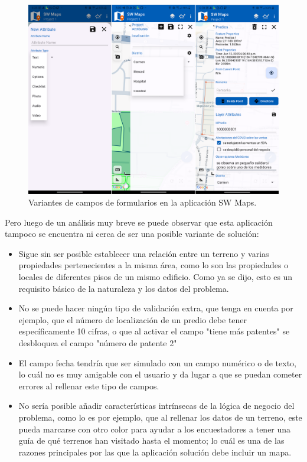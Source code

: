 \begin{figure}[h]
    \centering
    \includegraphics[scale=0.15]{Graphics/sw_maps_campos.png}
    \caption{Variantes de campos de formularios en la aplicación SW Maps.}
    \label{fig:figura9}
\end{figure}

Pero luego de un análisis muy breve se puede observar que esta aplicación tampoco se encuentra ni cerca de ser una posible variante de solución:
\begin{itemize}
    \item Sigue sin ser posible establecer una relación entre un terreno y varias propiedades pertenecientes a la misma área, como lo son las propiedades o locales de diferentes pisos de un mismo edificio. Como ya se dijo, esto es un requisito básico de la naturaleza y los datos del problema.
    \item No se puede hacer ningún tipo de validación extra, que tenga en cuenta por ejemplo, que el número de localización de un predio debe tener específicamente 10 cifras, o que al activar el campo "tiene más patentes" se desbloquea el campo "número de patente 2"
    \item El campo fecha tendría que ser simulado con un campo numérico o de texto, lo cuál no es muy amigable con el usuario y da lugar a que se puedan cometer errores al rellenar este tipo de campos.
    \item No sería posible añadir características intrínsecas de la lógica de negocio del problema, como lo es por ejemplo, que al rellenar los datos de un terreno, este pueda marcarse con otro color para ayudar a los encuestadores a tener una guía de qué terrenos han visitado hasta el momento; lo cuál es una de las razones principales por las que la aplicación solución debe incluir un mapa.
\end{itemize}







